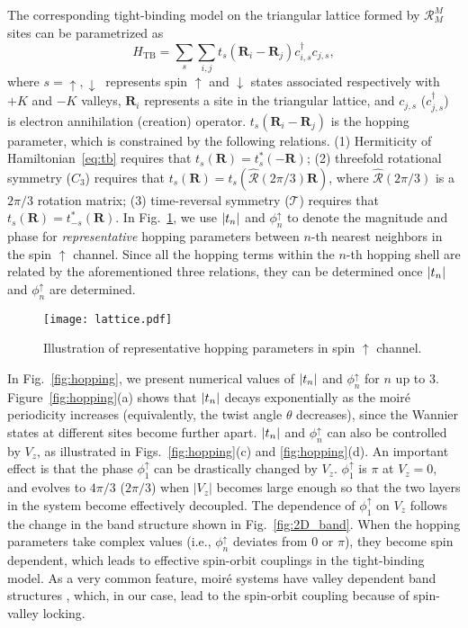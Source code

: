 \documentclass[aps,prx,floatfix,twocolumn]{revtex4-1}
\begin{document}
	
	The corresponding tight-binding model on the triangular lattice formed by $\mathcal{R}_M^M$ sites can be parametrized as
	\begin{equation}\label{eq:tb}
	H_{\text{TB}}=\sum_{s}\sum_{i,j}^{} t_{s}\left(\bm{R}_i-\bm{R}_j\right) c_{i,s}^\dagger c_{j,s},
	\end{equation}
	where $ s= \uparrow,\downarrow\ $ represents spin $\uparrow$ and $\downarrow$ states associated respectively with $ +K $ and $-K$ valleys, $ \bm{R}_i $ represents a site in the triangular lattice, and $ c_{j,s} $ ($ c_{j,s}^\dagger $) is  electron annihilation (creation) operator. $t_{s}\left(\bm{R}_i-\bm{R}_j\right)$ is the hopping parameter, which is constrained by the following relations. (1) Hermiticity of Hamiltonian~\eqref{eq:tb} requires that $  t_{s}\left(\bm{R}\right)= t_{s}^*\left(-\bm{R}\right)  $; (2) threefold rotational symmetry ($ C_3 $) requires that $  t_{s}\left(\bm{R}\right) =  t_{s}\left(\hat{\mathcal{R}}(2\pi/3)\bm{R}\right)  $, where $ \hat{\mathcal{R}}(2\pi/3) $ is a $2\pi/3$ rotation matrix; (3) time-reversal symmetry ($ \mathcal{T} $) requires that $  t_{s}\left(\bm{R}\right)= t_{-s}^*\left(\bm{R}\right) $. In Fig.~\ref{fig:lattice}, we use $ \abs{t_n} $ and $ \phi_{n}^{\uparrow} $ to denote the magnitude and phase for {\it representative} hopping parameters between $n$-th nearest neighbors in the spin $\uparrow$ channel. Since all the hopping terms within the $n$-th hopping shell are related by the aforementioned three relations, they can be determined once $ \abs{t_n} $ and $ \phi_{n}^{\uparrow} $ are determined.


  	\begin{figure}[t]
		\centering
		\texttt{[image: lattice.pdf]}
		\caption{Illustration of representative hopping parameters in spin $\uparrow$ channel.}	
		\label{fig:lattice}
	\end{figure}	
	
	In Fig.~\ref{fig:hopping}, we present numerical values of $\abs{t_n}$ and $\phi_{n}^{\uparrow}$  for $n$ up to 3. Figure~\ref{fig:hopping}(a) shows that $ \abs{t_n} $ decays exponentially as the moir\'e periodicity increases (equivalently, the twist angle $ \theta $ decreases), since the Wannier states at different sites become further apart.  $\abs{t_n}$ and $\phi_{n}^{\uparrow}$ can also be controlled by $V_z$, as illustrated in Figs.~\ref{fig:hopping}(c) and \ref{fig:hopping}(d). An important effect is that the phase $\phi_{1}^{\uparrow}$ can be drastically changed by $V_z$.   $\phi_{1}^{\uparrow}$ is $\pi$ at $V_z=0$, and evolves to $4\pi/3$ ($2\pi/3$) when $|V_z|$ becomes large enough so that the two layers in the system become effectively decoupled. The dependence of $\phi_{1}^{\uparrow}$ on $V_z$ follows the change in the band structure shown in Fig.~\ref{fig:2D_band}. When  the hopping parameters take complex values (i.e., $\phi_{n}^{\uparrow}$ deviates from $0$ or $\pi$), they become spin dependent, which leads to effective spin-orbit couplings in the tight-binding model. As a very common feature, moir\'e systems have valley dependent band structures \cite{bistritzer2011moire, po2018origin, zhang2019bridging}, which, in our case, lead to the spin-orbit coupling because of spin-valley locking.
	
\end{document}
